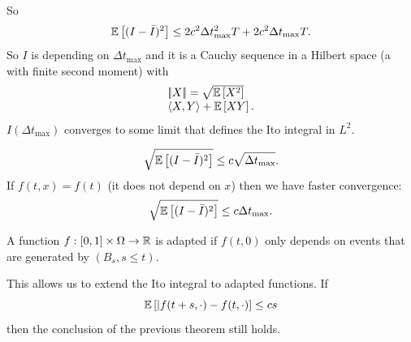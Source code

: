 \documentclass[12pt]{report}
\begin{document}
\begin{fancyproof}
	So 
	\begin{equation*}
		\mathbb{E}\left[(I-\bar{I})^{2}\right]\leq 2c^{2}\Delta t^{2}_{\max}T+2c^{2}\Delta t_{\max}T.
	\end{equation*}
	So $I$ is depending on $\Delta t_{\max}$ and it is a Cauchy sequence in a Hilbert space (a \rv{} with finite second moment) with
\begin{equation*}
		\begin{array}{l}
		\left|\negthinspace\left|X\right|\negthinspace\right|=\sqrt{\mathbb{E}\left[X^{2}\right]}\\
		\langle X,Y\rangle+\mathbb{E}\left[XY\right].
	\end{array}
\end{equation*}
$I(\Delta t_{\max})$ converges to some limit that defines the Ito integral in $L^{2}$.
\end{fancyproof}
\begin{remark}
	\begin{equation*}
		\sqrt{\mathbb{E}\left[(I-\bar{I})^{2}\right]}\leq c\sqrt{\Delta t_{\max}}.
	\end{equation*}
	If $f(t,x)=f(t)$ (it does not depend on $x$) then we have faster convergence:
	\begin{equation*}
		\sqrt{\mathbb{E}\left[(I-\bar{I})^{2}\right]}\leq c\Delta t_{\max}.
	\end{equation*}
\end{remark}
\begin{definition}
	A function $f:[0,1]\times\Omega\to\mathbb{R}$ is adapted if $f(t,0)$ only depends on events that are generated by $(B_{s},s\leq t)$.
\end{definition}
This allows us to extend the Ito integral to adapted functions. If
\begin{equation*}
	\mathbb{E}\left[|f(t+s,\cdot)-f(t,\cdot)\right]\leq cs
\end{equation*}
then the conclusion of the previous theorem still holds.
\end{document}
